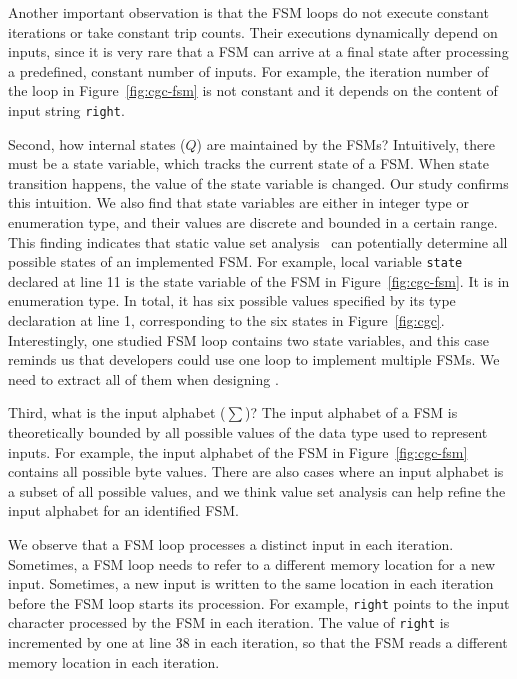 Another important observation is that 
the FSM loops do not execute constant 
iterations or take constant trip counts.
Their executions dynamically depend on inputs, 
since it is very rare that a FSM can arrive at a final 
state after processing a predefined, constant number of inputs. 
For example, the iteration number of the 
loop in Figure~\ref{fig:cgc-fsm}
is not constant and it
depends on the content of input string \texttt{right}.

Second, how internal states ($Q$) are maintained by the FSMs?
Intuitively, there must be a state variable, which tracks the current state of a FSM.
When state transition happens, 
the value of the state variable is changed. 
Our study confirms this intuition. 
We also find that state variables are either in integer type or enumeration type,
and their values are discrete and bounded in a certain range. 
This finding indicates that static value set analysis~\cite{DEEPVSA,VSA} 
can potentially determine all possible states of an implemented FSM.
For example, local variable \texttt{state} declared at line 11
is the state variable of the FSM in Figure~\ref{fig:cgc-fsm}.
It is in enumeration type.
In total, it has six possible values 
specified by its type declaration at line 1, 
corresponding to the six states in Figure~\ref{fig:cgc}.
Interestingly, one studied FSM loop contains two state variables,
and this case reminds us that developers could use one loop 
to implement multiple FSMs. 
We need to extract all of them when designing \Tool{}.



Third, what is the input alphabet ($\sum$)? 
The input alphabet of a FSM is theoretically bounded by all possible values 
of the data type used to represent inputs. 
For example, the input alphabet of the FSM 
in Figure~\ref{fig:cgc-fsm} contains all possible byte values.
There are also cases where an input alphabet is a subset of all possible values, 
and we think value set analysis can help refine 
the input alphabet for an identified FSM.

We observe that a FSM loop processes a distinct input in each iteration. 
Sometimes, a FSM loop needs to refer to a different memory location for a new input. 
Sometimes, a new input is written to the same 
location in each iteration before the FSM loop starts its procession.    
For example, \texttt{right} points to the input character 
processed by the FSM in each iteration. 
The value of \texttt{right} is incremented by one at line 38 in each iteration, 
so that the FSM reads a different memory location in each iteration. 


